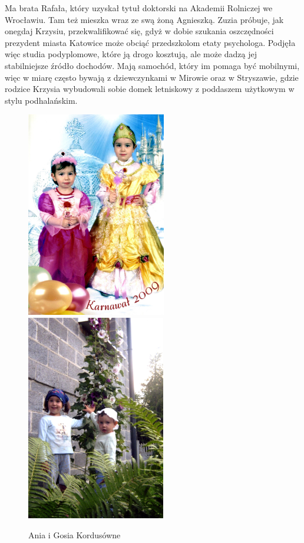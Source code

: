 Ma brata Rafała, który uzyskał tytuł doktorski na Akademii Rolniczej we Wrocławiu. Tam też mieszka wraz ze swą żoną Agnieszką. Zuzia próbuje, jak onegdaj Krzysiu, przekwalifikować się, gdyż w dobie szukania oszczędności prezydent miasta Katowice może obciąć przedszkolom etaty psychologa. Podjęła więc studia podyplomowe, które ją drogo kosztują, ale może dadzą jej stabilniejsze źródło dochodów. Mają samochód, który im pomaga być mobilnymi, więc w miarę często bywają z dziewczynkami w Mirowie oraz w Stryszawie, gdzie rodzice Krzysia wybudowali sobie domek letniskowy z poddaszem użytkowym w stylu podhalańskim.
\begin{figure}[!h]
\begin{center}
\includegraphics[height=90mm]{photo/gosia_ania_kordus_1.jpg}
\includegraphics[height=90mm]{photo/gosia_ania_kordus_2.jpg}
\caption{Ania i Gosia Kordusówne}
\end{center}
\end{figure}









